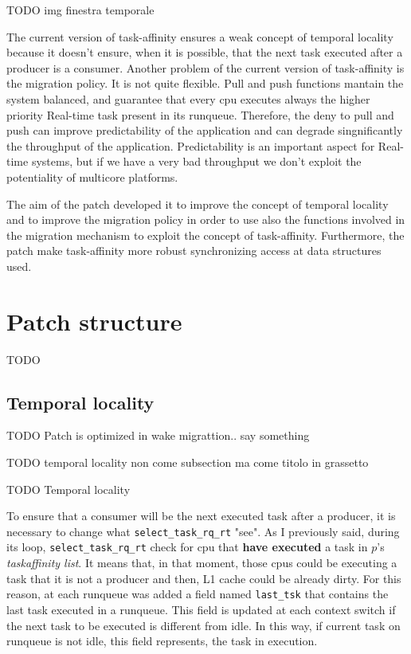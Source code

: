 TODO img finestra temporale

The current version of task-affinity ensures a weak concept of temporal locality because it doesn't ensure, when it is possible, that the next task executed 
after a producer is a consumer. Another problem of the current version of task-affinity is the migration policy. It is not quite flexible. Pull and push 
functions mantain the system balanced, and guarantee that every cpu executes always the higher priority Real-time task present in its runqueue.
Therefore, the deny to pull and push can improve predictability of the application and can degrade singnificantly the throughput of the application.
Predictability is an important aspect for Real-time systems, but if we have a very bad throughput we don't exploit the potentiality of multicore platforms.

The aim of the patch developed it to improve the concept of temporal locality and to improve the migration policy in order to use also the functions 
involved in the migration mechanism to exploit the concept of task-affinity. Furthermore, the patch make task-affinity more robust synchronizing access at 
data structures used.

\section{Patch structure}

TODO

\subsection{Temporal locality}

TODO Patch is optimized in wake migrattion.. say something

TODO temporal locality non come subsection ma come titolo in grassetto

TODO Temporal locality

To ensure that a consumer will be the next executed task after a producer, it is necessary to change what \texttt{select\_task\_rq\_rt} "see". As I 
previously said, during its loop, \texttt{select\_task\_rq\_rt} check for cpu that \textbf{have executed} a task in $p$'s \textit{taskaffinity list}. 
It means that, in that moment, those cpus could be executing a task that it is not a producer and then, L1 cache could be already dirty. For this reason, 
at each runqueue was added a field named \texttt{last\_tsk} that contains the last task executed in a runqueue. This field is updated at each context switch 
if the next task to be executed is different from idle. In this way, if current task on runqueue is not idle, this field represents, the task in execution. 


